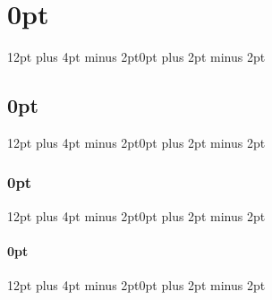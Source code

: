 \usepackage{acronym} 

\usepackage{caption}
\captionsetup{justification=raggedright,singlelinecheck=false}


\titlespacing\chapter{0pt}{12pt plus 4pt minus 2pt}{0pt plus 2pt minus 2pt}
\titlespacing\section{0pt}{12pt plus 4pt minus 2pt}{0pt plus 2pt minus 2pt}
\titlespacing\subsection{0pt}{12pt plus 4pt minus 2pt}{0pt plus 2pt minus 2pt}
\titlespacing\subsubsection{0pt}{12pt plus 4pt minus 2pt}{0pt plus 2pt minus 2pt}

\usepackage{pythonhighlight}
\usepackage{matlab-prettifier}